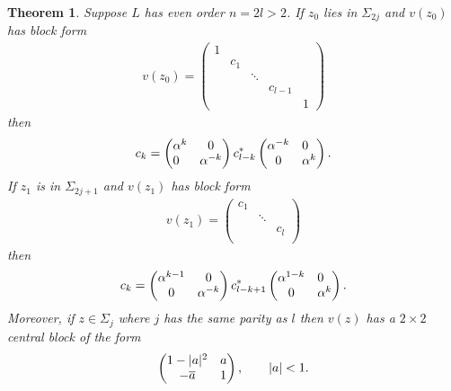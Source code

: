 \documentclass{surv-l}
\theoremstyle{plain}
\newtheorem{theorem}{Theorem}[section]
\theoremstyle{definition}
\numberwithin{equation}{chapter}
\begin{document}
\begin{theorem}\label{thm16.17}
Suppose $L$ has even order $n=2l>2$. If $z_{0}$  lies in $\Sigma_{2j}$ and $v(z_{0})$ has block form
\setcounter{equation}{17}
\begin{align}\label{eq16.18}
v(z_{0})=\left(\begin{array}{ccccc}
  1 &  &  &  &  \\
   & c_{1} &  &  &  \\
   &  & \ddots &  &  \\
   &  &  & c_{l-1} &  \\
   &  &  &  & 1
\end{array}\right)
\end{align}
then
\begin{align}\label{eq16.19}
c_{k}=\left(\begin{array}{@{}lc@{}}
\alpha^{k} & 0\\
0 & \alpha^{-k}
\end{array}\right) c_{l-k}^{*} \left(\begin{array}{@{}cl@{}}
\alpha^{-k} & 0\\
0 & \alpha^{k}
\end{array}\right).
\end{align}
If $z_{1}$ is in $\Sigma_{2j+1}$ and $v(z_{1})$ has block form
\begin{align}\label{eq16.20}
v(z_{1})=\left(\begin{array}{ccc}
 c_{1} &  & \\
 & \ddots &  \\
 & & c_{l} \\
\end{array}\right)
\end{align}
then
\begin{align}\label{eq16.21}
c_{k}=\left(\begin{array}{@{}cc@{}}
\alpha^{k-1} & 0\\
0 & \alpha^{-k}
\end{array}\right) c_{l-k+1}^{*} \left(\begin{array}{@{}cl@{}}
\alpha^{1-k} & 0\\
0 & \alpha^{k}
\end{array}\right).
\end{align}
Moreover, if $z\in\Sigma_{j}$ where $j$ has the same parity as $l$ then $v(z)$ has a $2\times 2$ central block of the form
\begin{align}\label{eq16.22}
\left(\begin{array}{@{}cl@{}}
1-|a|^{2} & a\\
-\overline{a} & 1
\end{array}\right),\qquad |a|<1.
\end{align}
\end{theorem}
\end{document}
